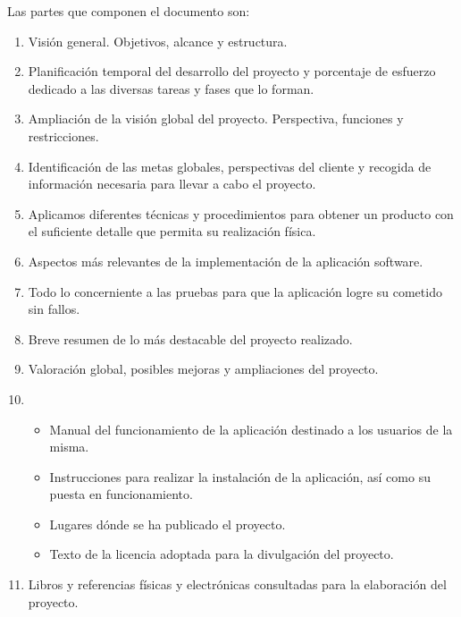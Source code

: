 Las partes que componen el documento son:

\begin{enumerate}
\item {} Visión general. Objetivos, alcance y estructura.
\item {} Planificación temporal del desarrollo del
  proyecto y porcentaje de esfuerzo dedicado a las diversas tareas y fases que
  lo forman.
\item {} Ampliación de la visión
  global del proyecto. Perspectiva, funciones y restricciones.
\item {} Identificación de las metas globales, perspectivas
  del cliente y recogida de información necesaria para llevar a cabo el
  proyecto.
\item {} Aplicamos diferentes técnicas y procedimientos para
  obtener un producto con el suficiente detalle que permita su realización
  física.
\item {} Aspectos más relevantes de la implementación de
  la aplicación software.
\item {} Todo lo concerniente a las pruebas para que la
  aplicación logre su cometido sin fallos.
\item {} Breve resumen de lo más destacable del proyecto
  realizado.
\item {} Valoración global, posibles mejoras y
  ampliaciones del proyecto.
\item {}
  \begin{itemize}
  \item {} Manual del funcionamiento de la aplicación
    destinado a los usuarios de la misma.
  \item {}
    Instrucciones para realizar la instalación de la aplicación, así como su
    puesta en funcionamiento.
  \item {} Lugares dónde se ha publicado el proyecto.
  \item {} Texto de la licencia adoptada para la divulgación
    del proyecto.
  \end{itemize}
\item {} Libros y referencias físicas y electrónicas
  consultadas para la elaboración del proyecto.
\end{enumerate}
